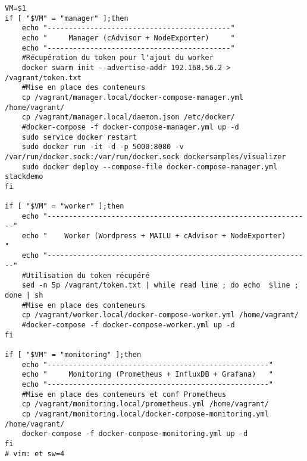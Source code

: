 \documentclass[oneside,12pt]{report}
\begin{document}
\begin{flushleft}
\begin{lstlisting}
VM=$1
if [ "$VM" = "manager" ];then
    echo "-------------------------------------------"
    echo "     Manager (cAdvisor + NodeExporter)     "
    echo "-------------------------------------------"
    #Récupération du token pour l'ajout du worker
    docker swarm init --advertise-addr 192.168.56.2 > /vagrant/token.txt
    #Mise en place des conteneurs
    cp /vagrant/manager.local/docker-compose-manager.yml /home/vagrant/
    cp /vagrant/manager.local/daemon.json /etc/docker/
    #docker-compose -f docker-compose-manager.yml up -d
    sudo service docker restart
    sudo docker run -it -d -p 5000:8080 -v /var/run/docker.sock:/var/run/docker.sock dockersamples/visualizer
    sudo docker deploy --compose-file docker-compose-manager.yml stackdemo
fi

if [ "$VM" = "worker" ];then
    echo "--------------------------------------------------------------"
    echo "    Worker (Wordpress + MAILU + cAdvisor + NodeExporter)      "
    echo "--------------------------------------------------------------"
    #Utilisation du token récupéré
    sed -n 5p /vagrant/token.txt | while read line ; do echo  $line ; done | sh
    #Mise en place des conteneurs
    cp /vagrant/worker.local/docker-compose-worker.yml /home/vagrant/
    #docker-compose -f docker-compose-worker.yml up -d
fi

if [ "$VM" = "monitoring" ];then
    echo "----------------------------------------------------"
    echo "     Monitoring (Prometheus + InfluxDB + Grafana)   "
    echo "----------------------------------------------------"
    #Mise en place des conteneurs et conf Prometheus
    cp /vagrant/monitoring.local/prometheus.yml /home/vagrant/
    cp /vagrant/monitoring.local/docker-compose-monitoring.yml /home/vagrant/
    docker-compose -f docker-compose-monitoring.yml up -d
fi
# vim: et sw=4

\end{lstlisting}

\end{flushleft}
\end{document}
